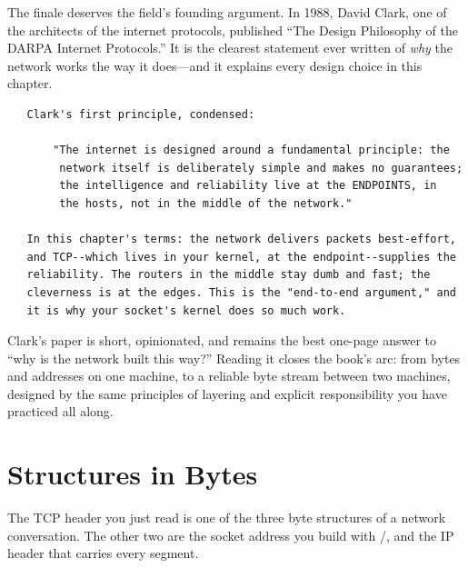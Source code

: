 \begin{researchnote}
The finale deserves the field's founding argument. In 1988, David
Clark, one of the architects of the internet protocols, published
``The Design Philosophy of the DARPA Internet Protocols.'' It is the
clearest statement ever written of \emph{why} the network works the
way it does---and it explains every design choice in this chapter.

\begin{verbatim}
   Clark's first principle, condensed:

       "The internet is designed around a fundamental principle: the
        network itself is deliberately simple and makes no guarantees;
        the intelligence and reliability live at the ENDPOINTS, in
        the hosts, not in the middle of the network."

   In this chapter's terms: the network delivers packets best-effort,
   and TCP--which lives in your kernel, at the endpoint--supplies the
   reliability. The routers in the middle stay dumb and fast; the
   cleverness is at the edges. This is the "end-to-end argument," and
   it is why your socket's kernel does so much work.
\end{verbatim}

Clark's paper is short, opinionated, and remains the best one-page
answer to ``why is the network built this way?'' Reading it closes the
book's arc: from bytes and addresses on one machine, to a reliable
byte stream between two machines, designed by the same principles of
layering and explicit responsibility you have practiced all along.

\end{researchnote}

\section{Structures in Bytes}

The TCP header you just read is one of the three byte structures of a
network conversation. The other two are the socket address you build
with /, and the IP header that carries every
segment.

